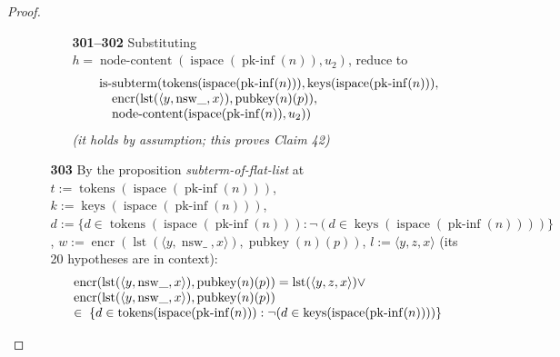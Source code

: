 \documentclass[11pt]{article}
\theoremstyle{plain}
\begin{document}
\begin{proof}
\begin{itemize}[leftmargin=2.8em, itemsep=4pt, parsep=1pt]
\begin{itemize}[leftmargin=2.8em, itemsep=4pt, parsep=1pt]
\begin{itemize}[leftmargin=2.8em, itemsep=4pt, parsep=1pt]
  \item[\textbf{301--302}] Substituting $h = \operatorname{node\text{-}content}(\operatorname{ispace}(\operatorname{pk\text{-}inf}(n)), u_{2})$, reduce to
\begin{equation*}
\begin{array}{@{}l@{}} \operatorname{is\text{-}subterm}(\operatorname{tokens}(\operatorname{ispace}(\operatorname{pk\text{-}inf}(n))), \operatorname{keys}(\operatorname{ispace}(\operatorname{pk\text{-}inf}(n))), \\ \quad \operatorname{encr}(\operatorname{lst}(\langle y, \operatorname{nsw\_}, x \rangle), \operatorname{pubkey}(n)(p)), \\ \quad \operatorname{node\text{-}content}(\operatorname{ispace}(\operatorname{pk\text{-}inf}(n)), u_{2})) \end{array}
\end{equation*}
  \emph{(it holds by assumption; this proves Claim 42)}
  \end{itemize}
  \item[\textbf{303}] By the proposition \emph{subterm-of-flat-list} at $t := \operatorname{tokens}(\operatorname{ispace}(\operatorname{pk\text{-}inf}(n)))$, $k := \operatorname{keys}(\operatorname{ispace}(\operatorname{pk\text{-}inf}(n)))$, $d := \{d \in \operatorname{tokens}(\operatorname{ispace}(\operatorname{pk\text{-}inf}(n))) : \neg (d \in \operatorname{keys}(\operatorname{ispace}(\operatorname{pk\text{-}inf}(n))))\}$, $w := \operatorname{encr}(\operatorname{lst}(\langle y, \operatorname{nsw\_}, x \rangle), \operatorname{pubkey}(n)(p))$, $l := \langle y, z, x \rangle$ (its 20 hypotheses are in context):
\begin{equation*}
\begin{array}{@{}l@{}} \operatorname{encr}(\operatorname{lst}(\langle y, \operatorname{nsw\_}, x \rangle), \operatorname{pubkey}(n)(p)) = \operatorname{lst}(\langle y, z, x \rangle) \vee \\ \operatorname{encr}(\operatorname{lst}(\langle y, \operatorname{nsw\_}, x \rangle), \operatorname{pubkey}(n)(p)) \\ \in\; \{d \in \operatorname{tokens}(\operatorname{ispace}(\operatorname{pk\text{-}inf}(n))) : \neg (d \in \operatorname{keys}(\operatorname{ispace}(\operatorname{pk\text{-}inf}(n))))\} \end{array}
\end{equation*}


\end{itemize}
\end{itemize}
\end{proof}
\end{document}
